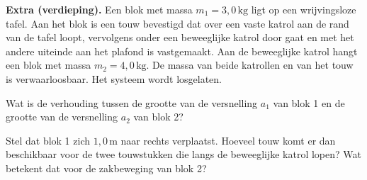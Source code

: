 \documentclass{ximera}
\begin{document}
\begin{exercise}
    \textbf{Extra (verdieping).} Een blok met massa $m_{1}= 3{,}0 \, \mathrm{kg}$ ligt op een wrijvingsloze tafel. Aan het blok is een touw bevestigd dat over een vaste katrol aan de rand van de tafel loopt, vervolgens onder een beweeglijke katrol door gaat en met het andere uiteinde aan het plafond is vastgemaakt. Aan de beweeglijke katrol hangt een blok met massa $m_{2}= 4{,}0 \, \mathrm{kg}$. De massa van beide katrollen en van het touw is verwaarloosbaar. Het systeem wordt losgelaten.

    \begin{center}
    \end{center}

    \begin{question}
        Wat is de verhouding tussen de grootte van de versnelling $a_{1}$ van blok 1 en de grootte van de versnelling $a_{2}$ van blok 2?


        \begin{hint}
            Stel dat blok 1 zich $1{,}0 \, \mathrm{m}$ naar rechts verplaatst. Hoeveel touw komt er dan beschikbaar voor de twee touwstukken die langs de beweeglijke katrol lopen? Wat betekent dat voor de zakbeweging van blok 2?
        \end{hint}


\end{question}
\end{exercise}
\end{document}
